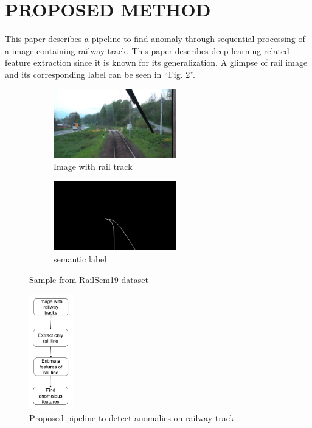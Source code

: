 \documentclass[conference]{IEEEtran}
\begin{document}
\section{PROPOSED METHOD}\label{proposed_method}
This paper describes a pipeline to find anomaly through sequential processing of a image containing railway track. This paper describes deep learning related feature extraction since it is known for its generalization. A glimpse of rail image and its corresponding label can be seen in  ``Fig. \ref{Railsem_sample}''. 
\begin{figure}[htbp]
\begin{subfigure}[b]{0.23\textwidth}
 \centerline{\includegraphics[width=\textwidth, height=3cm]{rs00004.jpg}}
 \caption{Image with rail track}
\end{subfigure}
\hfill
\begin{subfigure}[b]{0.23\textwidth}
 \centerline{\includegraphics[width=\textwidth, height=3cm]{maskrs00004.png}}
 \caption{semantic label}
 \label{label}
\end{subfigure}
\caption{Sample from RailSem19 \cite{9025646} dataset}
\label{Railsem_sample}
\end{figure}

\begin{figure}[htbp]
\centerline{\includegraphics[height=5cm]{Flow_chart.PNG}}
\caption{Proposed pipeline to detect anomalies on railway track}
\label{pipeline}
\end{figure} 
\end{document}
